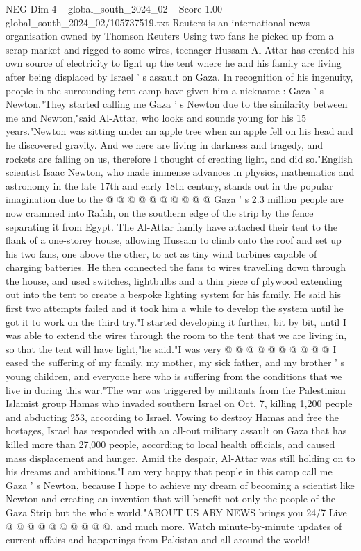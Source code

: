 \begin{textsample}{NEG Dim 4 – global\_south\_2024\_02 – Score 1.00 – global\_south\_2024\_02/105737519.txt}  \label{ex:f4_neg_383}
Reuters is an international news organisation owned by Thomson Reuters Using two fans he picked up from a scrap market and rigged to some wires, teenager Hussam Al-Attar has created his own source of electricity to light up the tent where he and his family are living after being displaced by Israel ' s assault on Gaza.
In recognition of his ingenuity, people in the surrounding tent camp have given him a nickname : Gaza ' s Newton."They started calling me Gaza ' s Newton due to the similarity between me and Newton,"said Al-Attar, who looks and sounds young for his 15 years."Newton was sitting under an apple tree when an apple fell on his head and he discovered gravity.
And we here are living in darkness and tragedy, and rockets are falling on us, therefore I thought of creating light, and did so."English scientist Isaac Newton, who made immense advances in physics, mathematics and astronomy in the late 17th and early 18th century, stands out in the popular imagination due to the @ @ @ @ @ @ @ @ @ @ Gaza ' s 2.3 million people are now crammed into Rafah, on the southern edge of the strip by the fence separating it from Egypt.
The Al-Attar family have attached their tent to the flank of a one-storey house, allowing Hussam to climb onto the roof and set up his two fans, one above the other, to act as tiny wind turbines capable of charging batteries.
He then connected the fans to wires travelling down through the house, and used switches, lightbulbs and a thin piece of plywood extending out into the tent to create a bespoke lighting system for his family.
He said his first two attempts failed and it took him a while to develop the system until he got it to work on the third try."I started developing it further, bit by bit, until I was able to extend the wires through the room to the tent that we are living in, so that the tent will have light,"he said."I was very @ @ @ @ @ @ @ @ @ @ I eased the suffering of my family, my mother, my sick father, and my brother ' s young children, and everyone here who is suffering from the conditions that we live in during this war."The war was triggered by militants from the Palestinian Islamist group Hamas who invaded southern Israel on Oct. 7, killing 1,200 people and abducting 253, according to Israel.
Vowing to destroy Hamas and free the hostages, Israel has responded with an all-out military assault on Gaza that has killed more than 27,000 people, according to local health officials, and caused mass displacement and hunger.
Amid the despair, Al-Attar was still holding on to his dreams and ambitions."I am very happy that people in this camp call me Gaza ' s Newton, because I hope to achieve my dream of becoming a scientist like Newton and creating an invention that will benefit not only the people of the Gaza Strip but the whole world."ABOUT US ARY NEWS brings you 24/7 Live @ @ @ @ @ @ @ @ @ @, and much more.
Watch minute-by-minute updates of current affairs and happenings from Pakistan and all around the world!

\end{textsample}
